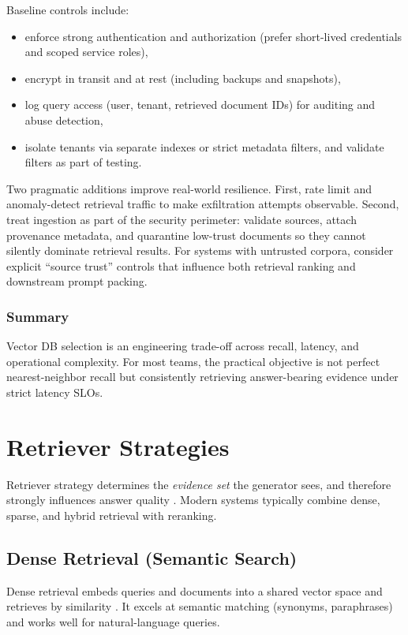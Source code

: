 Baseline controls include:
\begin{itemize}
    \item enforce strong authentication and authorization (prefer short-lived credentials and scoped service roles),
    \item encrypt in transit and at rest (including backups and snapshots),
    \item log query access (user, tenant, retrieved document IDs) for auditing and abuse detection,
    \item isolate tenants via separate indexes or strict metadata filters, and validate filters as part of testing.
\end{itemize}

Two pragmatic additions improve real-world resilience. First, rate limit and anomaly-detect retrieval traffic to make exfiltration attempts observable. Second, treat ingestion as part of the security perimeter: validate sources, attach provenance metadata, and quarantine low-trust documents so they cannot silently dominate retrieval results. For systems with untrusted corpora, consider explicit ``source trust'' controls that influence both retrieval ranking and downstream prompt packing.

\subsubsection*{Summary}
Vector DB selection is an engineering trade-off across recall, latency, and operational complexity. For most teams, the practical objective is not perfect nearest-neighbor recall but consistently retrieving answer-bearing evidence under strict latency SLOs.

\FloatBarrier
\section{Retriever Strategies}
\label{sec:rag-retriever-strategies}
Retriever strategy determines the \emph{evidence set} the generator sees, and therefore strongly influences answer quality \cite{Lewis2020RAG,Karpukhin2020DPR,Thakur2021BEIR}. Modern systems typically combine dense, sparse, and hybrid retrieval with reranking.

\subsection{Dense Retrieval (Semantic Search)}
Dense retrieval embeds queries and documents into a shared vector space and retrieves by similarity \cite{Karpukhin2020DPR}. It excels at semantic matching (synonyms, paraphrases) and works well for natural-language queries.

